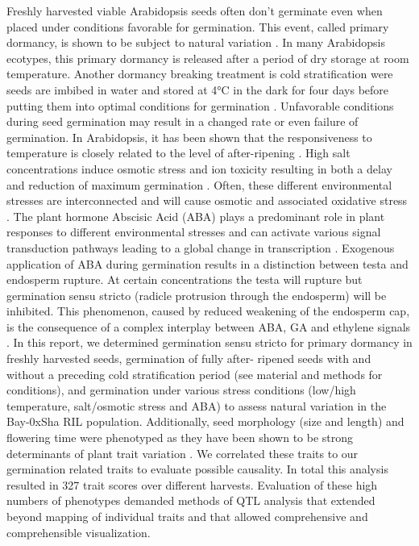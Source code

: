Freshly harvested viable Arabidopsis seeds often don't germinate even when placed under conditions 
favorable for germination. This event, called primary dormancy, is shown to be subject to natural 
variation \cite{Bentsink:2010}. In many Arabidopsis ecotypes, this primary dormancy is released after 
a period of dry storage at room temperature. Another dormancy breaking treatment is cold stratification 
were seeds are imbibed in water and stored at 4°C in the dark for four days before putting them into 
optimal conditions for germination \cite{Finch-Savage:2006}. Unfavorable conditions during seed 
germination may result in a changed rate or even failure of germination. In Arabidopsis, it has been 
shown that the responsiveness to temperature is closely related to the level of after-ripening 
\cite{Tamura:2006}. High salt concentrations induce osmotic stress and ion toxicity resulting in both 
a delay and reduction of maximum germination \cite{Galpaz:2010}. Often, these different environmental 
stresses are interconnected and will cause osmotic and associated oxidative stress \cite{Zhu:2002, 
Chinnusamy:2004}. The plant hormone Abscisic Acid (ABA) plays a predominant role in plant 
responses to different environmental stresses and can activate various signal transduction pathways 
leading to a global change in transcription \cite{Finkelstein:2002, Xiong:2002}. Exogenous application 
of ABA during germination results in a distinction between testa and endosperm rupture. At certain 
concentrations the testa will rupture but germination sensu stricto (radicle protrusion through the 
endosperm) will be inhibited. This phenomenon, caused by reduced weakening of the endosperm cap, is 
the consequence of a complex interplay between ABA, GA and ethylene signals \cite{Linkies:2009}. 
In this report, we determined germination sensu stricto for primary dormancy in freshly harvested seeds, 
germination of fully after- ripened seeds with and without a preceding cold stratification period 
(see material and methods for conditions), and germination under various stress conditions (low/high 
temperature, salt/osmotic stress and ABA) to assess natural  variation in the Bay-0xSha RIL population. 
Additionally, seed morphology (size and length) and flowering time were phenotyped as they have been 
shown to be strong determinants of plant trait variation \cite{Elwell:2011, Chiang:2009, Orsi:2009}. 
We correlated these traits to our germination related traits to evaluate 
possible causality. In total this analysis resulted in 327 trait scores over different harvests. 
Evaluation of these high numbers of phenotypes demanded methods of QTL analysis that extended beyond 
mapping of individual traits and that allowed comprehensive and comprehensible visualization.

